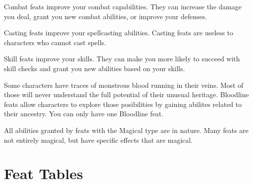          Combat feats improve your combat capabilities.
        They can increase the damage you deal, grant you new combat abilities, or improve your defenses.

         Casting feats improve your spellcasting abilities.
        Casting feats are useless to characters who cannot cast spells.

         Skill feats improve your skills.
        They can make you more likely to succeed with skill checks and grant you new abilities based on your skills.

         Some characters have traces of monstrous blood running in their veins.
        Most of those will never understand the full potential of their unusual heritage.
        Bloodline feats allow characters to explore those posibilities by gaining abilites related to their ancestry.
        You can only have one Bloodline feat.

        All abilities granted by feats with the Magical type are  in nature.
        Many feats are not entirely magical, but have specific effects that are magical.

\section{Feat Tables}

